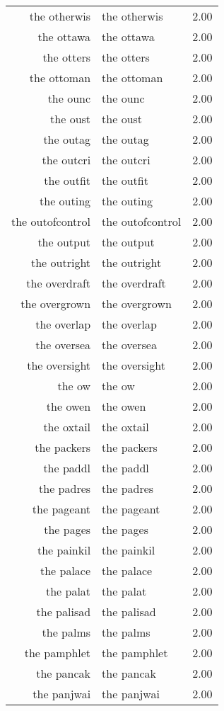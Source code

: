 \begin{table}[ht]
\begin{tabular}{rlr}
  the otherwis & the otherwis & 2.00 \\ 
  the ottawa & the ottawa & 2.00 \\ 
  the otters & the otters & 2.00 \\ 
  the ottoman & the ottoman & 2.00 \\ 
  the ounc & the ounc & 2.00 \\ 
  the oust & the oust & 2.00 \\ 
  the outag & the outag & 2.00 \\ 
  the outcri & the outcri & 2.00 \\ 
  the outfit & the outfit & 2.00 \\ 
  the outing & the outing & 2.00 \\ 
  the outofcontrol & the outofcontrol & 2.00 \\ 
  the output & the output & 2.00 \\ 
  the outright & the outright & 2.00 \\ 
  the overdraft & the overdraft & 2.00 \\ 
  the overgrown & the overgrown & 2.00 \\ 
  the overlap & the overlap & 2.00 \\ 
  the oversea & the oversea & 2.00 \\ 
  the oversight & the oversight & 2.00 \\ 
  the ow & the ow & 2.00 \\ 
  the owen & the owen & 2.00 \\ 
  the oxtail & the oxtail & 2.00 \\ 
  the packers & the packers & 2.00 \\ 
  the paddl & the paddl & 2.00 \\ 
  the padres & the padres & 2.00 \\ 
  the pageant & the pageant & 2.00 \\ 
  the pages & the pages & 2.00 \\ 
  the painkil & the painkil & 2.00 \\ 
  the palace & the palace & 2.00 \\ 
  the palat & the palat & 2.00 \\ 
  the palisad & the palisad & 2.00 \\ 
  the palms & the palms & 2.00 \\ 
  the pamphlet & the pamphlet & 2.00 \\ 
  the pancak & the pancak & 2.00 \\ 
  the panjwai & the panjwai & 2.00 \\ 

\end{tabular}
\end{table}

